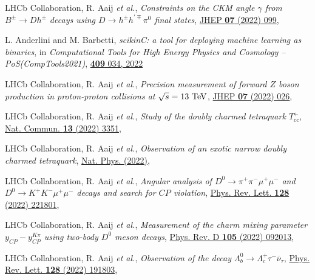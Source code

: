\begin{cvcontent}
\begin{enumerate}[label={[\arabic*]}, leftmargin=1.5cm]
    \item LHCb Collaboration, R. Aaij \emph{et al.}, 
    \emph{Constraints on the CKM angle $\gamma$ from $B^\pm \rightarrow Dh^\pm$ decays using $D \rightarrow h^\pm h^{\prime\mp}\pi^0$ final states},
    \href{https://doi.org/10.1007/JHEP07(2022)099}{JHEP \textbf{07} (2022) 099},
    \item L. Anderlini and M. Barbetti, 
    \emph{scikinC: a tool for deploying machine learning as binaries}, 
    in \emph{Computational Tools for High Energy Physics and Cosmology -- PoS(CompTools2021)}, 
    \href{https://doi.org/10.22323/1.409.0034}{\textbf{409} 034, 2022}
    \item LHCb Collaboration, R. Aaij \emph{et al.}, 
    \emph{Precision measurement of forward $Z$ boson production in proton-proton collisions at $\sqrt{s} = 13~\rm{TeV}$},
    \href{https://doi.org/10.1007/JHEP07(2022)026}{JHEP \textbf{07} (2022) 026},
    \item LHCb Collaboration, R. Aaij \emph{et al.}, 
    \emph{Study of the doubly charmed tetraquark $T_{cc}^+$},
    \href{https://doi.org/10.1038/s41467-022-30206-w}{Nat. Commun. \textbf{13} (2022) 3351},
    \item LHCb Collaboration, R. Aaij \emph{et al.}, 
    \emph{Observation of an exotic narrow doubly charmed tetraquark},
    \href{https://doi.org/10.1038/s41567-022-01614-y}{Nat. Phys. (2022)},
    \sloppy
    \item LHCb Collaboration, R. Aaij \emph{et al.}, 
    \emph{Angular analysis of $D^0 \to \pi^+\pi^-\mu^+\mu^-$ and $D^0 \to K^+K^-\mu^+\mu^-$ decays and search for $CP$ violation},
    \href{https://link.aps.org/doi/10.1103/PhysRevLett.128.221801}{Phys. Rev. Lett. \textbf{128} (2022) 221801},
    \item LHCb Collaboration, R. Aaij \emph{et al.},
    \emph{Measurement of the charm mixing parameter $y_{CP} - y_{CP}^{K\pi}$ using two-body $D^0$ meson decays},
    \href{https://link.aps.org/doi/10.1103/PhysRevD.105.092013}{Phys. Rev. D \textbf{105} (2022) 092013},
    \item LHCb Collaboration, R. Aaij \emph{et al.}, 
    \emph{Observation of the decay $\Lambda_b^0 \rightarrow \Lambda_c^+\tau^-\overline{\nu}_{\tau}$},
    \href{https://link.aps.org/doi/10.1103/PhysRevLett.128.191803}{Phys. Rev. Lett. \textbf{128} (2022) 191803},

\end{enumerate}
\end{cvcontent}
